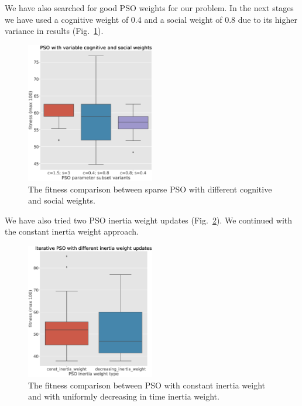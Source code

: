 \documentclass[conference]{IEEEtran}
\begin{document}
    We have also searched for good PSO weights for our problem.
    In the next stages we have used a cognitive weight of 0.4 and a social weight of 0.8 due to
    its higher variance in results (Fig.~\ref{fig:pso_configs}).

    \begin{figure}[!h]
        \centering
        \includegraphics[width=0.5\textwidth]{old_images/pso_configs.eps}
        \caption{The fitness comparison between sparse PSO with different cognitive and social weights.}
        \label{fig:pso_configs}
    \end{figure}

    We have also tried two PSO inertia weight updates (Fig.~\ref{fig:pso_inertia}).
    We continued with the constant inertia weight approach.

    \begin{figure}[!h]
        \centering
        \includegraphics[width=0.5\textwidth]{old_images/pso_inertia.eps}
        \caption{The fitness comparison between PSO with constant inertia
        weight and with uniformly decreasing in time inertia weight.}
        \label{fig:pso_inertia}
    \end{figure}
\end{document}
